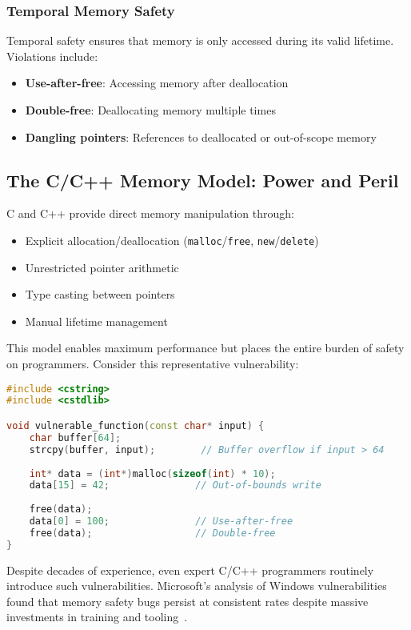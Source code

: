 \documentclass[11pt]{article}
\begin{document}
\subsubsection{Temporal Memory Safety}
Temporal safety ensures that memory is only accessed during its valid lifetime. Violations include:
\begin{itemize}
    \item \textbf{Use-after-free}: Accessing memory after deallocation
    \item \textbf{Double-free}: Deallocating memory multiple times
    \item \textbf{Dangling pointers}: References to deallocated or out-of-scope memory
\end{itemize}

\subsection{The C/C++ Memory Model: Power and Peril}

C and C++ provide direct memory manipulation through:
\begin{itemize}
    \item Explicit allocation/deallocation (\texttt{malloc}/\texttt{free}, \texttt{new}/\texttt{delete})
    \item Unrestricted pointer arithmetic
    \item Type casting between pointers
    \item Manual lifetime management
\end{itemize}

This model enables maximum performance but places the entire burden of safety on programmers. Consider this representative vulnerability:

\begin{lstlisting}[language=C++,caption={Multiple memory safety violations in C++},label={lst:cpp_violations}]
#include <cstring>
#include <cstdlib>

void vulnerable_function(const char* input) {
    char buffer[64];
    strcpy(buffer, input);        // Buffer overflow if input > 64
    
    int* data = (int*)malloc(sizeof(int) * 10);
    data[15] = 42;               // Out-of-bounds write
    
    free(data);
    data[0] = 100;               // Use-after-free
    free(data);                  // Double-free
}
\end{lstlisting}

Despite decades of experience, even expert C/C++ programmers routinely introduce such vulnerabilities. Microsoft's analysis of Windows vulnerabilities found that memory safety bugs persist at consistent rates despite massive investments in training and tooling~\cite{msrc2019trends}.
\end{document}

